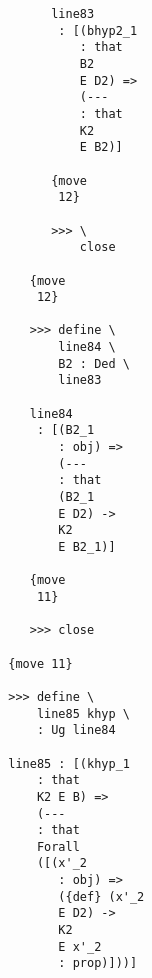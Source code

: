 \documentclass[12pt]{article}
\begin{document}
\begin{verbatim}
                                       line83 
                                        : [(bhyp2_1 
                                           : that 
                                           B2 
                                           E D2) => 
                                           (--- 
                                           : that 
                                           K2 
                                           E B2)]

                                       {move 
                                        12}

                                       >>> \
                                           close

                                    {move 
                                     12}

                                    >>> define \
                                        line84 \
                                        B2 : Ded \
                                        line83

                                    line84 
                                     : [(B2_1 
                                        : obj) => 
                                        (--- 
                                        : that 
                                        (B2_1 
                                        E D2) -> 
                                        K2 
                                        E B2_1)]

                                    {move 
                                     11}

                                    >>> close

                                 {move 11}

                                 >>> define \
                                     line85 khyp \
                                     : Ug line84

                                 line85 : [(khyp_1 
                                     : that 
                                     K2 E B) => 
                                     (--- 
                                     : that 
                                     Forall 
                                     ([(x'_2 
                                        : obj) => 
                                        ({def} (x'_2 
                                        E D2) -> 
                                        K2 
                                        E x'_2 
                                        : prop)]))]


\end{verbatim}
\end{document}
